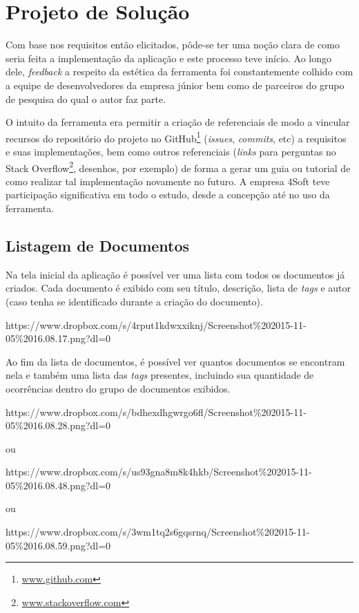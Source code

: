 \chapter{Projeto de Solução}

Com base nos requisitos então elicitados, pôde-se ter uma noção clara de como seria feita a implementação da aplicação e este processo teve início. Ao longo dele, \textit{feedback} a respeito da estética da ferramenta foi constantemente colhido com a equipe de desenvolvedores da empresa júnior bem como de parceiros do grupo de pesquisa do qual o autor faz parte.

O intuito da ferramenta era permitir a criação de referenciais de modo a vincular recursos do repositório do projeto no GitHub\footnote{\url{www.github.com}} (\textit{issues}, \textit{commits}, etc) a requisitos e suas implementações, bem como outros referenciais (\textit{links} para perguntas no Stack Overflow\footnote{\url{www.stackoverflow.com}}, desenhos, por exemplo) de forma a gerar um guia ou tutorial de como realizar tal implementação novamente no futuro. A empresa 4Soft teve participação significativa em todo o estudo, desde a concepção até no uso da ferramenta.


\section{Listagem de Documentos}

Na tela inicial da aplicação é possível ver uma lista com todos os documentos já criados. Cada documento é exibido com seu título, descrição, lista de \textit{tags} e autor (caso tenha se identificado durante a criação do documento).

https://www.dropbox.com/s/4rput1kdwxxiknj/Screenshot\%202015-11-05\%2016.08.17.png?dl=0

Ao fim da lista de documentos, é possível ver quantos documentos se encontram nela e também uma lista das \textit{tags} presentes, incluindo sua quantidade de ocorrências dentro do grupo de documentos exibidos.

https://www.dropbox.com/s/bdhexdhgwrgo6fl/Screenshot\%202015-11-05\%2016.08.28.png?dl=0

ou

https://www.dropbox.com/s/us93gna8m8k4hkb/Screenshot\%202015-11-05\%2016.08.48.png?dl=0

ou

https://www.dropbox.com/s/3wm1tq2s6gqsrnq/Screenshot\%202015-11-05\%2016.08.59.png?dl=0

